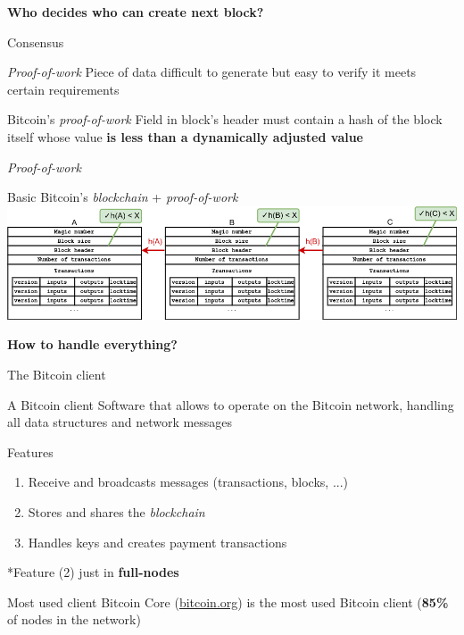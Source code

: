 \documentclass{beamer}
\begin{document}
\begin{frame}
 \begin{center}
  \textbf{Who decides who can create next block?}
 \end{center}
\end{frame}
\begin{frame}{Consensus}
 \begin{block}{\textit{Proof-of-work}}
  Piece of data difficult to generate but easy to verify it meets certain
  requirements
 \end{block}
 \pause
 \begin{block}{Bitcoin's \textit{proof-of-work}}
  Field in block's header must contain a hash of the block itself whose
  value \textbf{is less than a dynamically adjusted value}
 \end{block}
\end{frame}
\begin{frame}{\textit{Proof-of-work}}
 \begin{exampleblock}{Basic Bitcoin's \textit{blockchain} + \textit{proof-of-work}}
  \includegraphics[width=\textwidth, height=0.8\textheight, keepaspectratio]{img/basic_blockchain_consensus.png}
 \end{exampleblock}
\end{frame}
\begin{frame}
 \begin{center}
  \textbf{How to handle everything?}
 \end{center}
\end{frame}
\begin{frame}{The Bitcoin client}
 \begin{block}{A Bitcoin client}
  Software that allows to operate on the Bitcoin network, handling all data structures and network messages
 \end{block}
 \pause
 \begin{block}{Features}
  \begin{enumerate}[<+->]
   \item Receive and broadcasts messages (transactions, blocks, ...)
   \item Stores and shares the \textit{blockchain}
   \item Handles keys and creates payment transactions
  \end{enumerate}
  \pause
  *Feature (2) just in \textbf{full-nodes}
 \end{block}
 \pause
 \begin{exampleblock}{Most used client}
  Bitcoin Core (\url{bitcoin.org}) is the most used Bitcoin client (\textbf{85\%} of nodes in the network)
 \end{exampleblock}
\end{frame}
\end{document}

